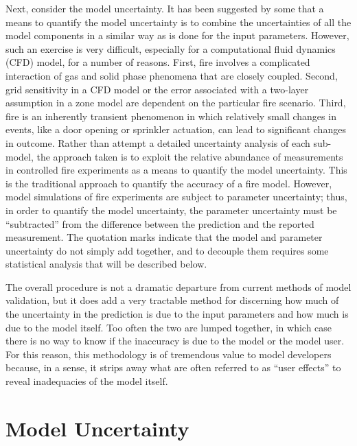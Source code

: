 Next, consider the model uncertainty. It has been suggested by some that
a means to quantify the model uncertainty is to combine the uncertainties of all the model components in a similar way as is done for the input parameters.
However, such an exercise is very difficult, especially for a computational fluid dynamics (CFD) model, for a number of reasons. First, fire involves
a complicated interaction of gas and solid phase phenomena that are closely coupled. Second, grid sensitivity in a CFD model or the error associated with
a two-layer assumption in a zone model are dependent on the particular fire scenario. Third, fire is an inherently transient phenomenon in which relatively small
changes in events, like a door opening or sprinkler actuation, can lead to significant changes in outcome. Rather than attempt a detailed uncertainty
analysis of each sub-model, the approach taken is to exploit the relative abundance of measurements in controlled fire
experiments as a means to quantify the model uncertainty. This is the traditional approach to quantify the accuracy of a fire model.
However, model simulations of fire experiments are subject to parameter uncertainty; thus, in order to quantify the model uncertainty,
the parameter uncertainty must be ``subtracted'' from the difference between the prediction and the reported measurement.
The quotation marks indicate that the model and parameter uncertainty do not simply add together,
and to decouple them requires some statistical analysis that will be described below.

The overall procedure is not a dramatic departure from current
methods of model validation, but it does add a very tractable method for discerning how much of the uncertainty in the prediction is due
to the input parameters and how much is due to the model itself. Too often the two are lumped together, in which case there is no way to know
if the inaccuracy is due to the model or the model user. For this reason, this methodology is of tremendous value to model developers because,
in a sense, it strips away what are often referred to as
``user effects'' to reveal inadequacies of the model itself.






\section{Model Uncertainty}

